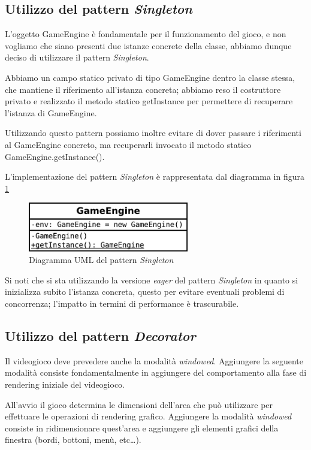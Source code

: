 \documentclass[a4paper,12pt]{article}
\begin{document}
\subsection{Utilizzo del pattern \emph{Singleton}}

L'oggetto \textsf{GameEngine} \`e fondamentale per il funzionamento del gioco, e non vogliamo che siano presenti due istanze concrete della classe, abbiamo dunque deciso di utilizzare il pattern \emph{Singleton}.

Abbiamo un campo statico privato di tipo \textsf{GameEngine} dentro la classe stessa, che mantiene il riferimento all'istanza concreta; abbiamo reso il costruttore privato e realizzato il metodo statico \textsf{getInstance} per permettere di recuperare l'istanza di \textsf{GameEngine}.

Utilizzando questo pattern possiamo inoltre evitare di dover passare i riferimenti al \textsf{GameEngine} concreto, ma recuperarli invocato il metodo statico \textsf{GameEngine.getInstance()}.

L'implementazione del pattern \emph{Singleton} \`e rappresentata dal diagramma in figura \ref{img:Singleton}

\begin{figure}[h]
\centering
\includegraphics[width=7cm]{Singleton.pdf}
\caption{Diagramma UML del pattern \emph{Singleton}}
\label{img:Singleton}
\end{figure}

Si noti che si sta utilizzando la versione \emph{eager} del pattern \emph{Singleton} in quanto si inizializza subito l'istanza concreta, questo per evitare eventuali problemi di concorrenza; l'impatto in termini di performance \`e trascurabile.

\subsection{Utilizzo del pattern \emph{Decorator}}

Il videogioco deve prevedere anche la modalit\`a \textit{windowed}. Aggiungere la seguente modalit\`a consiste fondamentalmente in aggiungere del comportamento alla fase di rendering iniziale del videogioco.

All'avvio il gioco determina le dimensioni dell'area che pu\`o utilizzare per effettuare le operazioni di rendering grafico. Aggiungere la modalit\`a \textit{windowed} consiste in ridimensionare quest'area e aggiungere gli elementi grafici della finestra (bordi, bottoni, men\`u, etc\dots{}).
\end{document}
